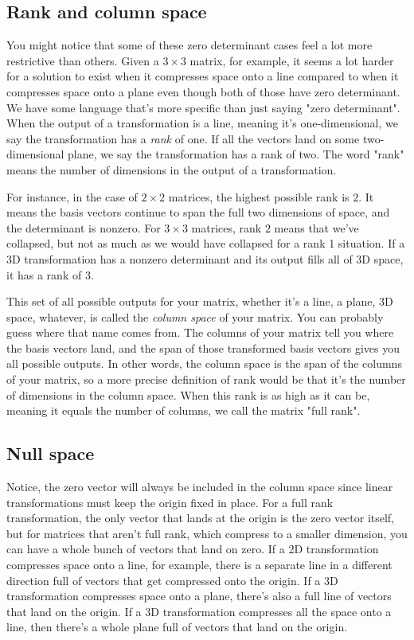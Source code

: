 \subsection{Rank and column space}

You might notice that some of these zero determinant cases feel a lot more
restrictive than others. Given a $3 \times 3$ matrix, for example, it seems a
lot harder for a solution to exist when it compresses space onto a line compared
to when it compresses space onto a plane even though both of those have zero
determinant. We have some language that's more specific than just saying "zero
determinant". When the output of a transformation is a line, meaning it's
one-dimensional, we say the transformation has a \textit{rank} of one. If all
the vectors land on some two-dimensional plane, we say the transformation has a
rank of two. The word "rank" means the number of dimensions in the output of a
transformation.

For instance, in the case of $2 \times 2$ matrices, the highest possible rank is
$2$. It means the basis vectors continue to span the full two dimensions of
space, and the determinant is nonzero. For $3 \times 3$ matrices, rank $2$ means
that we've collapsed, but not as much as we would have collapsed for a rank 1
situation. If a 3D transformation has a nonzero determinant and its output fills
all of 3D space, it has a rank of $3$.

This set of all possible outputs for your matrix, whether it's a line, a plane,
3D space, whatever, is called the \textit{column space} of your matrix. You can
probably guess where that name comes from. The columns of your matrix tell you
where the basis vectors land, and the span of those transformed basis vectors
gives you all possible outputs. In other words, the column space is the span of
the columns of your matrix, so a more precise definition of rank would be that
it's the number of dimensions in the column space. When this rank is as high as
it can be, meaning it equals the number of columns, we call the matrix "full
rank".

\subsection{Null space}

Notice, the zero vector will always be included in the column space since linear
transformations must keep the origin fixed in place. For a full rank
transformation, the only vector that lands at the origin is the zero vector
itself, but for matrices that aren't full rank, which compress to a smaller
dimension, you can have a whole bunch of vectors that land on zero. If a 2D
transformation compresses space onto a line, for example, there is a separate
line in a different direction full of vectors that get compressed onto the
origin. If a 3D transformation compresses space onto a plane, there's also a
full line of vectors that land on the origin. If a 3D transformation compresses
all the space onto a line, then there's a whole plane full of vectors that land
on the origin.

